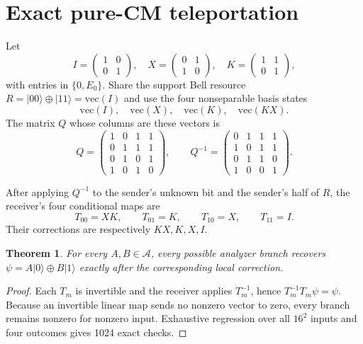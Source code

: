 \documentclass[11pt]{article}
\newtheorem{theorem}{Theorem}
\newcommand{\A}{\mathcal A}
\newcommand{\xorp}{\mathbin{\oplus}}
\newcommand{\ket}[1]{\lvert #1\rangle}
\begin{document}
\section{Exact pure-CM teleportation}

Let
\[
I=\begin{pmatrix}1&0\\0&1\end{pmatrix},\quad
X=\begin{pmatrix}0&1\\1&0\end{pmatrix},\quad
K=\begin{pmatrix}1&1\\0&1\end{pmatrix},
\]
with entries in $\{0,E_0\}$.  Share the support Bell resource
$R=\ket{00}\xorp\ket{11}=\mathrm{vec}(I)$ and use the four nonseparable
basis states
\[
\mathrm{vec}(I),\quad\mathrm{vec}(X),\quad
\mathrm{vec}(K),\quad\mathrm{vec}(KX).
\]
The matrix $Q$ whose columns are these vectors is
\[
Q=\begin{pmatrix}
1&0&1&1\\
0&1&1&1\\
0&1&0&1\\
1&0&1&0
\end{pmatrix},\qquad
Q^{-1}=\begin{pmatrix}
0&1&1&1\\
1&0&1&1\\
0&1&1&0\\
1&0&0&1
\end{pmatrix}.
\]

After applying $Q^{-1}$ to the sender's unknown bit and the sender's half of
$R$, the receiver's four conditional maps are
\[
T_{00}=XK,\qquad T_{01}=K,\qquad T_{10}=X,\qquad T_{11}=I.
\]
Their corrections are respectively $KX,K,X,I$.

\begin{theorem}
For every $A,B\in\A$, every possible analyzer branch recovers
$\psi=A\ket0\xorp B\ket1$ exactly after the corresponding local correction.
\end{theorem}

\begin{proof}
Each $T_m$ is invertible and the receiver applies $T_m^{-1}$, hence
$T_m^{-1}T_m\psi=\psi$.  Because an invertible linear map sends no nonzero
vector to zero, every branch remains nonzero for nonzero input.  Exhaustive
regression over all $16^2$ inputs and four outcomes gives 1024 exact checks.
\end{proof}
\end{document}
